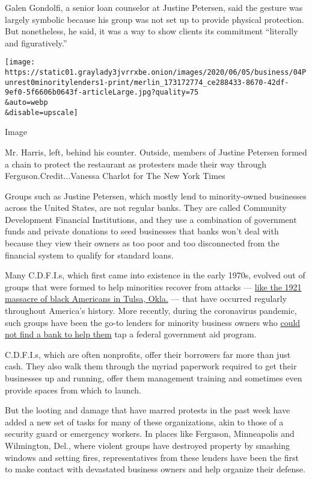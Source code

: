 Galen Gondolfi, a senior loan counselor at Justine Petersen, said the
gesture was largely symbolic because his group was not set up to provide
physical protection. But nonetheless, he said, it was a way to show
clients its commitment ``literally and figuratively.''

\texttt{[image: https://static01.graylady3jvrrxbe.onion/images/2020/06/05/business/04Punrest0minoritylenders1-print/merlin\_173172774\_ce288433-8670-42df-9ef0-5f6606b0643f-articleLarge.jpg?quality=75\\\&auto=webp\\\&disable=upscale]}

Image

Mr. Harris, left, behind his counter. Outside, members of Justine
Petersen formed a chain to protect the restaurant as protesters made
their way through Ferguson.Credit...Vanessa Charlot for The New York
Times

Groups such as Justine Petersen, which mostly lend to minority-owned
businesses across the United States, are not regular banks. They are
called Community Development Financial Institutions, and they use a
combination of government funds and private donations to seed businesses
that banks won't deal with because they view their owners as too poor
and too disconnected from the financial system to qualify for standard
loans.

Many C.D.F.I.s, which first came into existence in the early 1970s,
evolved out of groups that were formed to help minorities recover from
attacks ---
\href{https://www.nytimes3xbfgragh.onion/2019/12/17/us/tulsa-graves-black-wall-street-massacre.html}{like
the 1921 massacre of black Americans in Tulsa, Okla.} --- that have
occurred regularly throughout America's history. More recently, during
the coronavirus pandemic, such groups have been the go-to lenders for
minority business owners who
\href{https://www.nytimes3xbfgragh.onion/2020/04/10/business/minority-business-coronavirus-loans.html}{could
not find a bank to help them} tap a federal government aid program.

C.D.F.I.s, which are often nonprofits, offer their borrowers far more
than just cash. They also walk them through the myriad paperwork
required to get their businesses up and running, offer them management
training and sometimes even provide spaces from which to launch.

But the looting and damage that have marred protests in the past week
have added a new set of tasks for many of these organizations, akin to
those of a security guard or emergency workers. In places like Ferguson,
Minneapolis and Wilmington, Del., where violent groups have destroyed
property by smashing windows and setting fires, representatives from
these lenders have been the first to make contact with devastated
business owners and help organize their defense.

